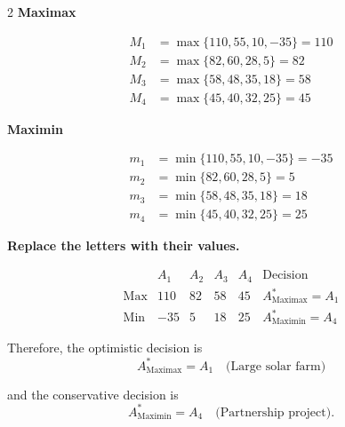 {\begin{multicols}{2}
			\textbf{Maximax}
			
			\[
			\begin{array}{ll}
				M_1 &= \max\{110,55,10,-35\}=110\\
				M_2 &= \max\{82,60,28,5\}=82\\
				M_3 &= \max\{58,48,35,18\}=58\\
				M_4 &= \max\{45,40,32,25\}=45
			\end{array}
			\]
			
			\textbf{Maximin}
			
			\[
			\begin{array}{ll}
				m_1 &= \min\{110,55,10,-35\}=-35\\
				m_2 &= \min\{82,60,28,5\}=5\\
				m_3 &= \min\{58,48,35,18\}=18\\
				m_4 &= \min\{45,40,32,25\}=25
			\end{array}
			\]
			
			\columnbreak
			
			\textbf{Replace the letters with their values.}
			
			\[
			\begin{array}{c|ccccc}
				& A_1 & A_2 & A_3 & A_4 & \text{Decision}\\
				\hline
				\text{Max} &
				110 & 82 & 58 & 45 &
				A^*_{\mathrm{Maximax}}=A_1
				\\
				\text{Min} &
				-35 & 5 & 18 & 25 &
				A^*_{\mathrm{Maximin}}=A_4
			\end{array}
			\]
			
			Therefore, the optimistic decision is
			\[
			A^*_{\mathrm{Maximax}}=A_1
			\quad\text{(Large solar farm)}
			\]
			
			and the conservative decision is
			\[
			A^*_{\mathrm{Maximin}}=A_4
			\quad\text{(Partnership project)}.
			\]
			
		\end{multicols}
	}

